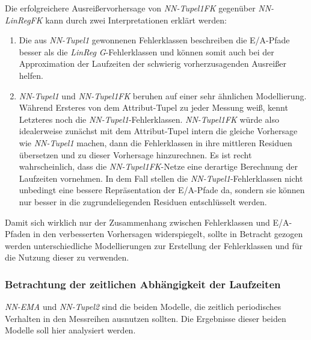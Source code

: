 \documentclass[
	12pt,
	a4paper,
	BCOR10mm,
	DIV14,
	listof=totoc,
	bibliography=totoc,
	headsepline
]{scrreprt}
\begin{document}
Die erfolgreichere Ausreißervorhersage von \textit{NN-Tupel1FK} gegenüber \textit{NN-LinRegFK} kann durch zwei Interpretationen erklärt werden:
\begin{enumerate}
	\item Die aus \textit{NN-Tupel1} gewonnenen Fehlerklassen beschreiben die E/A-Pfade besser als die \textit{LinReg G}-Fehlerklassen und können somit auch bei der Approximation der Laufzeiten der schwierig vorherzusagenden Ausreißer helfen.
	\item \textit{NN-Tupel1} und \textit{NN-Tupel1FK} beruhen auf einer sehr ähnlichen Modellierung.
	Während Ersteres von dem Attribut-Tupel zu jeder Messung weiß, kennt Letzteres noch die \textit{NN-Tupel1}-Fehlerklassen.
	\textit{NN-Tupel1FK} würde also idealerweise zunächst mit dem Attribut-Tupel intern die gleiche Vorhersage wie \textit{NN-Tupel1} machen, dann die Fehlerklassen in ihre mittleren Residuen übersetzen und zu dieser Vorhersage hinzurechnen.
	Es ist recht wahrscheinlich, dass die \textit{NN-Tupel1FK}-Netze eine derartige Berechnung der Laufzeiten vornehmen. In dem Fall stellen die \textit{NN-Tupel1}-Fehlerklassen nicht unbedingt eine bessere Repräsentation der E/A-Pfade da, sondern sie können nur besser in die zugrundeliegenden Residuen entschlüsselt werden.
\end{enumerate}
Damit sich wirklich nur der Zusammenhang zwischen Fehlerklassen und E/A-Pfaden in den verbesserten Vorhersagen widerspiegelt, sollte in Betracht gezogen werden unterschiedliche Modellierungen zur Erstellung der Fehlerklassen und für die Nutzung dieser zu verwenden.

\subsubsection{Betrachtung der zeitlichen Abhängigkeit der Laufzeiten}
\textit{NN-EMA} und \textit{NN-Tupel2} sind die beiden Modelle, die zeitlich periodisches Verhalten in den Messreihen ausnutzen sollten.
Die Ergebnisse dieser beiden Modelle soll hier analysiert werden.\medskip
\end{document}
